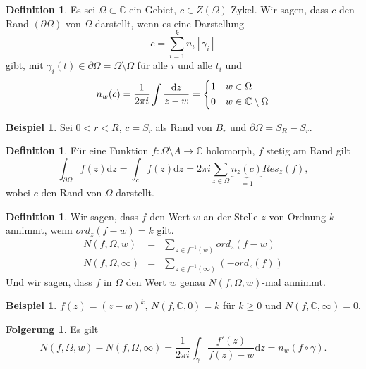 \documentclass[11pt,titlepage]{article}
\theoremstyle{definition}
\newtheorem{corollary}[theorem]{Folgerung}
\newtheorem{definition}[theorem]{Definition}
\newtheorem{example}[theorem]{Beispiel}
\theoremstyle{remark}
\begin{document}
	\begin{definition}
		Es sei $\Omega\subset\mathbb{C}$ ein Gebiet, $c\in Z(\Omega)$ Zykel. Wir sagen, dass 
		$c$ den Rand $(\partial \Omega)$ von $\Omega$ darstellt, wenn es eine Darstellung 
		\[ c=\sum_{i=1}^k n_i[\gamma_i] \]
		gibt, mit $\gamma_i(t)\in\partial\Omega =\overline{\Omega}\setminus\Omega$ für alle $i$ und alle 
		$t_i$ und
		\[ n_w(c)=\frac{1}{2\pi i}\int \frac{\mathrm{d}z}{z-w} =\begin{dcases}1&w\in\Omega \\ 0&w\in
		\mathbb{C}\setminus\Omega \end{dcases} \]
	\end{definition}
	
	\begin{example}
		Sei $0<r<R$, $c=S_r$ als Rand von $B_r$ und $\partial\Omega =S_R -S_r$.
		
		
	\end{example}
	
	\begin{definition}
		Für eine Funktion $f:\Omega\setminus A\to\mathbb{C}$ holomorph, $f$ stetig am Rand gilt
		\[ \int_{\partial\Omega} f(z)\mathrm{d}z =\int_c f(z)\mathrm{d}z =2\pi i\sum_{z\in\Omega}
		\underbrace{n_z(c)}_{=1}Res_z(f), \]
		wobei $c$ den Rand von $\Omega$ darstellt.
	\end{definition}
	
	\begin{definition}
		Wir sagen, dass $f$ den Wert $w$ an der Stelle $z$ von Ordnung $k$ annimmt, wenn $ord_z(f-w)=k$ 
		gilt. 
		\begin{eqnarray*}
			N(f,\Omega,w)&=&\sum_{z\in f^{-1}(w)}ord_z(f-w) \\
			N(f,\Omega,\infty)&=& \sum_{z\in f^{-1}(\infty)}(-ord_z(f))
		\end{eqnarray*}
		Und wir sagen, dass $f$ in $\Omega$ den Wert $w$ genau $N(f,\Omega,w)$-mal annimmt.
	\end{definition}
	
	\begin{example}
		$f(z)=(z-w)^k$, $N(f,\mathbb{C},0)=k$ für $k\geq 0$ und $N(f,\mathbb{C},\infty)=0$.
	\end{example}
	
	\begin{corollary}\label{coroll:Umlauf}
		Es gilt 
		\[ N(f,\Omega,w)-N(f,\Omega,\infty) =\frac{1}{2\pi i} \int_{\gamma} \frac{f'(z)}{f(z)-w}\mathrm{d}z=
		n_w (f\circ\gamma).\]
	\end{corollary}
	
\end{document}

